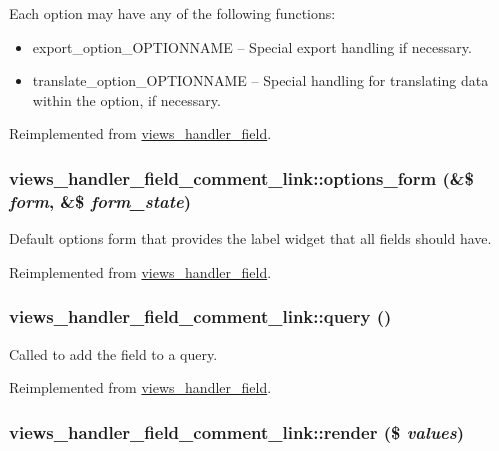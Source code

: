  Each option may have any of the following functions:\begin{itemize}
\item export\_\-option\_\-OPTIONNAME -- Special export handling if necessary.\item translate\_\-option\_\-OPTIONNAME -- Special handling for translating data within the option, if necessary. \end{itemize}


Reimplemented from \hyperlink{classviews__handler__field_64c69a8a3697603f8283405071c25b76}{views\_\-handler\_\-field}.\hypertarget{classviews__handler__field__comment__link_82957426a30584198c79c78804265bdc}{
\subsubsection[{options\_\-form}]{\setlength{\rightskip}{0pt plus 5cm}views\_\-handler\_\-field\_\-comment\_\-link::options\_\-form (\&\$ {\em form}, \/  \&\$ {\em form\_\-state})}}
\label{classviews__handler__field__comment__link_82957426a30584198c79c78804265bdc}


Default options form that provides the label widget that all fields should have. 

Reimplemented from \hyperlink{classviews__handler__field_0435d161922b7b4b84f02a2e79bb947a}{views\_\-handler\_\-field}.\hypertarget{classviews__handler__field__comment__link_c19c2cedce77bfa9490624df9cd1eac2}{
\subsubsection[{query}]{\setlength{\rightskip}{0pt plus 5cm}views\_\-handler\_\-field\_\-comment\_\-link::query ()}}
\label{classviews__handler__field__comment__link_c19c2cedce77bfa9490624df9cd1eac2}


Called to add the field to a query. 

Reimplemented from \hyperlink{classviews__handler__field_4f661f91bcbe80d4a00c30a31456c502}{views\_\-handler\_\-field}.\hypertarget{classviews__handler__field__comment__link_c5e8317cc1a0b2a7688f865662b27dae}{
\subsubsection[{render}]{\setlength{\rightskip}{0pt plus 5cm}views\_\-handler\_\-field\_\-comment\_\-link::render (\$ {\em values})}}
\label{classviews__handler__field__comment__link_c5e8317cc1a0b2a7688f865662b27dae}


